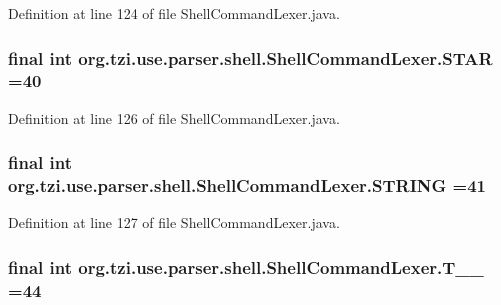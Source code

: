 Definition at line 124 of file Shell\-Command\-Lexer.\-java.

\hypertarget{classorg_1_1tzi_1_1use_1_1parser_1_1shell_1_1_shell_command_lexer_a0dfad5e768849d1b24f82bcd45361b96}{
\subsubsection[{S\-T\-A\-R}]{\setlength{\rightskip}{0pt plus 5cm}final int org.\-tzi.\-use.\-parser.\-shell.\-Shell\-Command\-Lexer.\-S\-T\-A\-R =40\hspace{0.3cm}{\ttfamily [static]}}}\label{classorg_1_1tzi_1_1use_1_1parser_1_1shell_1_1_shell_command_lexer_a0dfad5e768849d1b24f82bcd45361b96}


Definition at line 126 of file Shell\-Command\-Lexer.\-java.

\hypertarget{classorg_1_1tzi_1_1use_1_1parser_1_1shell_1_1_shell_command_lexer_afeeba69ed15e429be141e0e73e6f6ba2}{
\subsubsection[{S\-T\-R\-I\-N\-G}]{\setlength{\rightskip}{0pt plus 5cm}final int org.\-tzi.\-use.\-parser.\-shell.\-Shell\-Command\-Lexer.\-S\-T\-R\-I\-N\-G =41\hspace{0.3cm}{\ttfamily [static]}}}\label{classorg_1_1tzi_1_1use_1_1parser_1_1shell_1_1_shell_command_lexer_afeeba69ed15e429be141e0e73e6f6ba2}


Definition at line 127 of file Shell\-Command\-Lexer.\-java.

\hypertarget{classorg_1_1tzi_1_1use_1_1parser_1_1shell_1_1_shell_command_lexer_acc709cb4e25962bbfff0d9c9015f034b}{
\subsubsection[{T\-\_\-\-\_\-44}]{\setlength{\rightskip}{0pt plus 5cm}final int org.\-tzi.\-use.\-parser.\-shell.\-Shell\-Command\-Lexer.\-T\-\_\-\-\_ =44\hspace{0.3cm}{\ttfamily [static]}}}\label{classorg_1_1tzi_1_1use_1_1parser_1_1shell_1_1_shell_command_lexer_acc709cb4e25962bbfff0d9c9015f034b}


